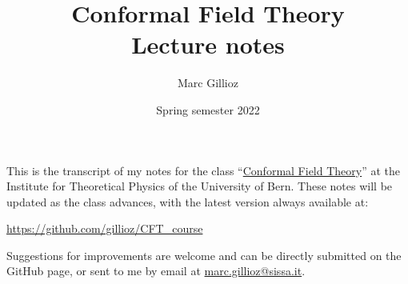 \documentclass[a4paper,12pt]{article}
\title{%
Conformal Field Theory
\\[1em]
\Large
Lecture notes}
\author{Marc Gillioz}
\date{Spring semester 2022}
\numberwithin{equation}{section}
\begin{document}
 

\maketitle

\vspace{10mm}	
	
This is the transcript of my notes for the class 
``\href{https://www.itp.unibe.ch/studies/graduate_program/f22_conformal_field_theory/index_eng.html}{Conformal Field Theory}'' at the Institute for Theoretical Physics of the University of Bern.
These notes will be updated as the class advances, with the latest version always available at:
\begin{center}
	\url{https://github.com/gillioz/CFT_course}
\end{center}
Suggestions for improvements are welcome and can be directly submitted on the GitHub page, or sent to me by email at \href{mailto:marc.gillioz@sissa.it}{marc.gillioz@sissa.it}.
	





\newpage

\tableofcontents
\end{document}
